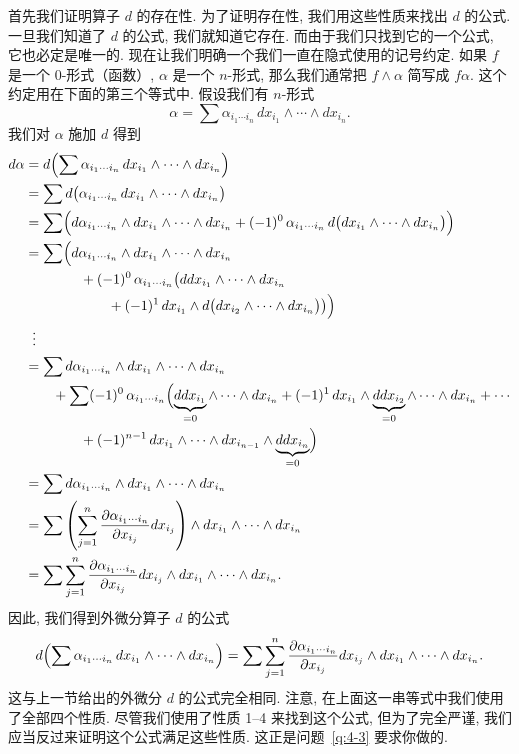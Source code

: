 首先我们证明算子 $d$ 的存在性. 为了证明存在性, 我们用这些性质来找出 $d$ 的公式. 一旦我们知道了 $d$ 的公式, 我们就知道它存在. 而由于我们只找到它的一个公式, 它也必定是唯一的. 现在让我们明确一个我们一直在隐式使用的记号约定. 如果 $f$ 是一个 0-形式（函数）, $\alpha$ 是一个 $n$-形式, 那么我们通常把 $f\wedge\alpha$ 简写成 $f\alpha$. 这个约定用在下面的第三个等式中. 假设我们有 $n$-形式
\[
\alpha=\sum \alpha_{i_1\cdots i_n}\,dx_{i_1}\wedge\cdots\wedge dx_{i_n}.
\]
我们对 $\alpha$ 施加 $d$ 得到
\begin{align*}
d\alpha&=d\Bigl(\sum \alpha_{i_1\cdots i_n}\,dx_{i_1}\wedge\cdots\wedge dx_{i_n}\Bigr)\\
&=\sum d\bigl(\alpha_{i_1\cdots i_n}\,dx_{i_1}\wedge\cdots\wedge dx_{i_n}\bigr)\\
&=\sum\Bigl(d\alpha_{i_1\cdots i_n}\wedge dx_{i_1}\wedge\cdots\wedge dx_{i_n}
+(-1)^0\,\alpha_{i_1\cdots i_n}\,d\bigl(dx_{i_1}\wedge\cdots\wedge dx_{i_n}\bigr)\Bigr)\\
&=\sum\Bigl(d\alpha_{i_1\cdots i_n}\wedge dx_{i_1}\wedge\cdots\wedge dx_{i_n}\\
&\qquad\qquad+(-1)^0\,\alpha_{i_1\cdots i_n}\bigl(ddx_{i_1}\wedge\cdots\wedge dx_{i_n}\\
&\qquad\qquad\qquad+(-1)^1\,dx_{i_1}\wedge d\bigl(dx_{i_2}\wedge\cdots\wedge dx_{i_n}\bigr)\bigr)\Bigr)\\
&\;\;\vdots\\
&=\sum d\alpha_{i_1\cdots i_n}\wedge dx_{i_1}\wedge\cdots\wedge dx_{i_n}\\
&\qquad+\sum(-1)^0\,\alpha_{i_1\cdots i_n}\Bigl(\underbrace{ddx_{i_1}}_{=0}\wedge\cdots\wedge dx_{i_n}
+(-1)^1\,dx_{i_1}\wedge\underbrace{ddx_{i_2}}_{=0}\wedge\cdots\wedge dx_{i_n}
+\cdots\\
&\qquad\qquad+(-1)^{n-1}\,dx_{i_1}\wedge\cdots\wedge dx_{i_{n-1}}\wedge\underbrace{ddx_{i_n}}_{=0}\Bigr)\\
&=\sum d\alpha_{i_1\cdots i_n}\wedge dx_{i_1}\wedge\cdots\wedge dx_{i_n}\\
&=\sum\left(\sum_{j=1}^{n}\frac{\partial\alpha_{i_1\cdots i_n}}{\partial x_{i_j}}dx_{i_j}\right)\wedge dx_{i_1}\wedge\cdots\wedge dx_{i_n}\\
&=\sum\sum_{j=1}^{n}\frac{\partial\alpha_{i_1\cdots i_n}}{\partial x_{i_j}}dx_{i_j}\wedge dx_{i_1}\wedge\cdots\wedge dx_{i_n}.
\end{align*}
因此, 我们得到外微分算子 $d$ 的公式
\[
d\Bigl(\sum \alpha_{i_1\cdots i_n}\,dx_{i_1}\wedge\cdots\wedge dx_{i_n}\Bigr)
=\sum\sum_{j=1}^{n}\frac{\partial\alpha_{i_1\cdots i_n}}{\partial x_{i_j}}dx_{i_j}\wedge dx_{i_1}\wedge\cdots\wedge dx_{i_n}.
\]
这与上一节给出的外微分 $d$ 的公式完全相同. 注意, 在上面这一串等式中我们使用了全部四个性质. 尽管我们使用了性质 1--4 来找到这个公式, 但为了完全严谨, 我们应当反过来证明这个公式满足这些性质. 这正是问题~\ref{q:4-3} 要求你做的.

